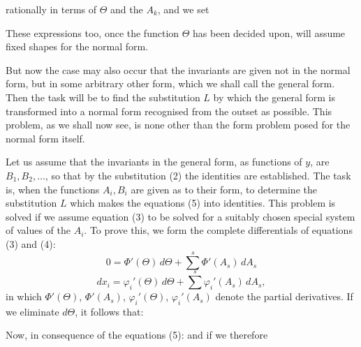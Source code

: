 

rationally in terms of $\Theta$ and the $A_k$, and we set

These expressions too, once the function $\Theta$ has been decided upon, will assume fixed shapes for the normal form.

But now the case may also occur that the invariants are given not in the normal form, but in some arbitrary other form, which we shall call the general form. Then the task will be to find the substitution $L$ by which the general form is transformed into a normal form recognised from the outset as possible. This problem, as we shall now see, is none other than the form problem posed for the normal form itself.

Let us assume that the invariants in the general form, as functions of $y$, are $B_1, B_2, \ldots$, so that by the substitution (2) the identities
are established. The task is, when the functions $A_i, B_i$ are given as to their form, to determine the substitution $L$ which makes the equations (5) into identities. This problem is solved if we assume equation (3) to be solved for a suitably chosen special system of values of the $A_i$. To prove this, we form the complete differentials of equations (3) and (4):
\[
0 = \Phi'(\Theta)\,d\Theta + \sum^s \Phi'(A_s)\,dA_s
\]
\[
dx_i = \varphi_i'(\Theta)\,d\Theta + \sum^s \varphi_i'(A_s)\,dA_s,
\]
in which $\Phi'(\Theta)$, $\Phi'(A_s)$, $\varphi_i'(\Theta)$, $\varphi_i'(A_s)$ denote the partial derivatives. If we eliminate $d\Theta$, it follows that:

Now, in consequence of the equations (5):
and if we therefore

